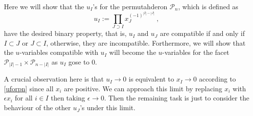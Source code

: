 \documentclass[hidelinks,12pt]{article}
\begin{document}
Here we will show that the $u_{I}$'s for the permutahderon $\mathscr{P}_{n}$, which is defined as 
\begin{equation}
   u_{I}:= \prod_{J\supset I}x_J^{(-1)^{|I|-|J|}} \:, \label{uforpn}
\end{equation}
have the desired binary property, that is, $u_{I}$ and $u_{J}$ are compatible if and only if $I \subset J$ or $J\subset I$, otherwise, they are incompatible. Forthermore, we will show that the $u$-variables compatible with $u_{I}$ will become the $u$-variables for the facet $\mathscr{P}_{\lvert I \rvert-1}\times \mathscr{P}_{n-\lvert I\rvert}$ as $u_{I}$ gose to 0.

A crucial observation here is that $u_{I}\to 0$ is equivalent to $x_{I}\to 0 $ according to \eqref{uforpn} since all $x_{i}$ are positive. We can approach this limit by replacing $x_{i}$ with $ \epsilon x_{i}$ for all $i\in I$ then taking $\epsilon \to 0$. Then the remaining task is just to consider the behaviour of the other $u_{J}$'s under this limit. 
\end{document}
